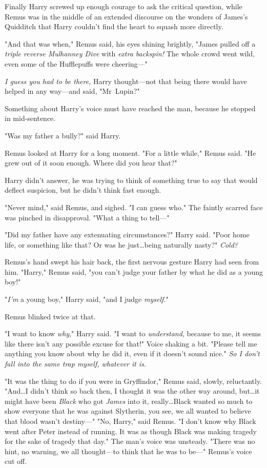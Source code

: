 Finally Harry screwed up enough courage to ask the critical question, while
Remus was in the middle of an extended discourse on the wonders of James's
Quidditch that Harry couldn't find the heart to squash more directly.

"And that was when," Remus said, his eyes shining brightly, "James pulled off a
\emph{triple reverse Mulhanney Dive} with \emph{extra backspin!} The whole
crowd went wild, even some of the Hufflepuffs were cheering---"

\emph{I guess you had to be there,} Harry thought---not that being there would
have helped in any way---and said, "Mr~Lupin?"

Something about Harry's voice must have reached the man, because he stopped in
mid-sentence.

"Was my father a bully?" said Harry.

Remus looked at Harry for a long moment. "For a little while," Remus said. "He
grew out of it soon enough. Where did you hear that?"

Harry didn't answer, he was trying to think of something true to say that would
deflect suspicion, but he didn't think fast enough.

"Never mind," said Remus, and sighed. "I can guess who." The faintly scarred
face was pinched in disapproval. "What a thing to tell---"

"Did my father have any extenuating circumstances?" Harry said. "Poor home
life, or something like that? Or was he just…being naturally
nasty?" \emph{Cold?}

Remus's hand swept his hair back, the first nervous gesture Harry had seen from
him. "Harry," Remus said, "you can't judge your father by what he did as a
young boy!"

"\emph{I'm} a young boy," Harry said, "and I judge \emph{myself.}"

Remus blinked twice at that.

"I want to know \emph{why}," Harry said. "I want to \emph{understand}, because
to me, it seems like there isn't any possible excuse for that!" Voice shaking a
bit. "Please tell me anything you know about why he did it, even if it doesn't
sound nice."  \emph{So I don't fall into the same trap myself, whatever it is.}

"It was the thing to do if you were in Gryffindor," Remus said, slowly,
reluctantly. "And…I didn't think so back then, I thought it was the
other way around, but…it might have been \emph{Black} who got
\emph{James} into it, really…Black wanted so much to show everyone that
he was against Slytherin, you see, we all wanted to believe that blood wasn't
destiny---"
\later
"No, Harry," said Remus. "I don't know why Black went after Peter instead of
running. It was as though Black was making tragedy for the sake of tragedy that
day." The man's voice was unsteady. "There was no hint, no warning, we all
thought---to think that he was to be---" Remus's voice cut off.

